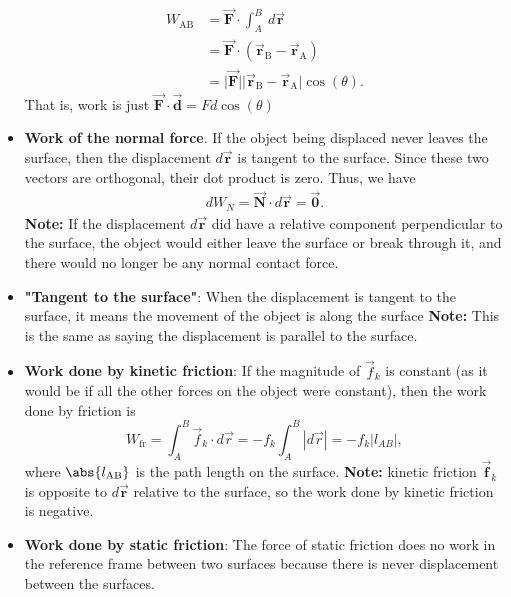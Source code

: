 \documentclass{report}
\begin{document}
\begin{itemize}
            \begin{align*}
                W_{\text{AB}} &= \vec{\mathbf{F}} \cdot \int_{A}^{B}\ d\vec{\mathbf{r}} \\
                &=\vec{\mathbf{F}} \cdot (\vec{\mathbf{r}}_{\text{B}} - \vec{\mathbf{r}}_{\text{A}}) \\
                &=\bigg\lvert \vec{\mathbf{F}} \bigg\rvert \bigg\lvert \vec{\mathbf{r}}_{\text{B}} - \vec{\mathbf{r}}_{\text{A}} \bigg\rvert\cos{\left(\theta \right)} 
            .\end{align*}
            That is, work is just $\vec{\mathbf{F}} \cdot \vec{\mathbf{d}}  = Fd\cos{\left(\theta \right)}$
        \item \textbf{Work of the normal force}. If the object being displaced never leaves the surface, then the displacement $d\vec{\mathbf{r}} $ is tangent to the surface. Since these two vectors are orthogonal, their dot product is zero. Thus, we have
            \begin{align*}
                dW_{N} = \vec{\mathbf{N}} \cdot d\vec{\mathbf{r}} = \vec{\mathbf{0}}
            .\end{align*}
            \bigbreak \noindent 
            \textbf{Note:} If the displacement $d\vec{\mathbf{r}}$ did have a relative component perpendicular to the surface, the object would either leave the surface or break through it, and there would no longer be any normal contact force.
        \item \textbf{"Tangent to the surface"}: When the displacement is tangent to the surface, it means the movement of the object is along the surface
            \bigbreak \noindent 
            \textbf{Note:} This is the same as saying the displacement is parallel to the surface.
        \item \textbf{Work done by kinetic friction}: 
            If the magnitude of $\vec{f}_k$ is constant (as it would be if all the other forces on the object were constant), then the work done by friction is
            \[
                W_{\text{fr}} = \int_{A}^{B} \vec{f}_k \cdot d\vec{r} = -f_k \int_{A}^{B} |d\vec{r}| = -f_k |l_{AB}|,
            \]
            \bigbreak \noindent 
            where  $\abs{l_{\text{AB}}}$ is the path length on the surface.
            \bigbreak \noindent 
            \textbf{Note:} kinetic friction $\vec{\mathbf{f}}_{k}$ is opposite to $d\vec{\mathbf{r}}$ relative to the surface, so the work done by kinetic friction is negative.
        \item \textbf{Work done by static friction}: The force of static friction does no work in the reference frame between two surfaces because there is never displacement between the surfaces.

\end{itemize}
\end{document}
